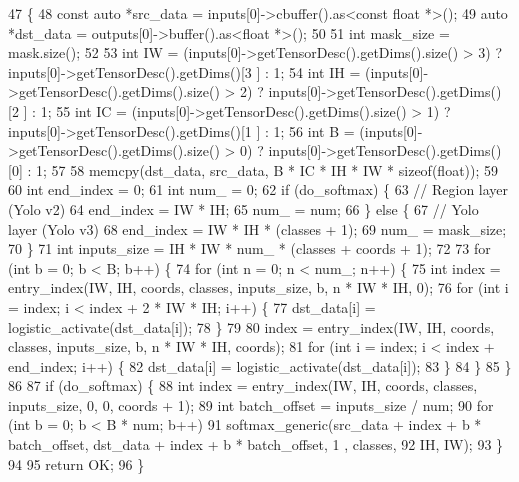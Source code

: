 \begin{DoxyCode}
47                                                              \{
48         \textcolor{keyword}{const} \textcolor{keyword}{auto} *src\_data = inputs[0]->cbuffer().as<\textcolor{keyword}{const} \textcolor{keywordtype}{float} *>();
49         \textcolor{keyword}{auto} *dst\_data = outputs[0]->buffer().as<\textcolor{keywordtype}{float} *>();
50 
51         \textcolor{keywordtype}{int} mask\_size = mask.size();
52 
53         \textcolor{keywordtype}{int} IW = (inputs[0]->getTensorDesc().getDims().size() > 3) ? inputs[0]->getTensorDesc().getDims()[3
      ] : 1;
54         \textcolor{keywordtype}{int} IH = (inputs[0]->getTensorDesc().getDims().size() > 2) ? inputs[0]->getTensorDesc().getDims()[2
      ] : 1;
55         \textcolor{keywordtype}{int} IC = (inputs[0]->getTensorDesc().getDims().size() > 1) ? inputs[0]->getTensorDesc().getDims()[1
      ] : 1;
56         \textcolor{keywordtype}{int} B = (inputs[0]->getTensorDesc().getDims().size() > 0) ? inputs[0]->getTensorDesc().getDims()[0]
       : 1;
57 
58         memcpy(dst\_data, src\_data, B * IC * IH * IW * \textcolor{keyword}{sizeof}(\textcolor{keywordtype}{float}));
59 
60         \textcolor{keywordtype}{int} end\_index = 0;
61         \textcolor{keywordtype}{int} num\_ = 0;
62         \textcolor{keywordflow}{if} (do\_softmax) \{
63             \textcolor{comment}{// Region layer (Yolo v2)}
64             end\_index = IW * IH;
65             num\_ = num;
66         \} \textcolor{keywordflow}{else} \{
67             \textcolor{comment}{// Yolo layer (Yolo v3)}
68             end\_index = IW * IH * (classes + 1);
69             num\_ = mask\_size;
70         \}
71         \textcolor{keywordtype}{int} inputs\_size = IH * IW * num\_ * (classes + coords + 1);
72 
73         \textcolor{keywordflow}{for} (\textcolor{keywordtype}{int} b = 0; b < B; b++) \{
74             \textcolor{keywordflow}{for} (\textcolor{keywordtype}{int} n = 0; n < num\_; n++) \{
75                 \textcolor{keywordtype}{int} index = entry\_index(IW, IH, coords, classes, inputs\_size, b, n * IW * IH, 0);
76                 \textcolor{keywordflow}{for} (\textcolor{keywordtype}{int} i = index; i < index + 2 * IW * IH; i++) \{
77                     dst\_data[i] = logistic\_activate(dst\_data[i]);
78                 \}
79 
80                 index = entry\_index(IW, IH, coords, classes, inputs\_size, b, n * IW * IH, coords);
81                 \textcolor{keywordflow}{for} (\textcolor{keywordtype}{int} i = index; i < index + end\_index; i++) \{
82                     dst\_data[i] = logistic\_activate(dst\_data[i]);
83                 \}
84             \}
85         \}
86 
87         \textcolor{keywordflow}{if} (do\_softmax) \{
88             \textcolor{keywordtype}{int} index = entry\_index(IW, IH, coords, classes, inputs\_size, 0, 0, coords + 1);
89             \textcolor{keywordtype}{int} batch\_offset = inputs\_size / num;
90             \textcolor{keywordflow}{for} (\textcolor{keywordtype}{int} b = 0; b < B * num; b++)
91                 softmax\_generic(src\_data + index + b * batch\_offset, dst\_data + index + b * batch\_offset, 1
      , classes,
92                                 IH, IW);
93         \}
94 
95         \textcolor{keywordflow}{return} OK;
96     \}
\end{DoxyCode}



